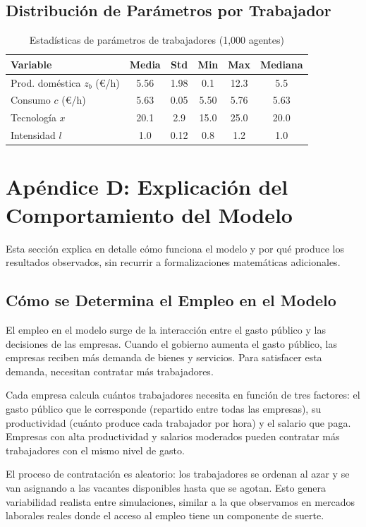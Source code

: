\subsection{Distribución de Parámetros por Trabajador}

\begin{table}[h]
\centering
\caption{Estadísticas de parámetros de trabajadores (1,000 agentes)}
\begin{tabular}{lccccc}
\toprule
\textbf{Variable} & \textbf{Media} & \textbf{Std} & \textbf{Min} & \textbf{Max} & \textbf{Mediana} \\
\midrule
Prod. doméstica $z_b$ (€/h) & 5.56 & 1.98 & 0.1 & 12.3 & 5.5 \\
Consumo $c$ (€/h) & 5.63 & 0.05 & 5.50 & 5.76 & 5.63 \\
Tecnología $x$ & 20.1 & 2.9 & 15.0 & 25.0 & 20.0 \\
Intensidad $l$ & 1.0 & 0.12 & 0.8 & 1.2 & 1.0 \\
\bottomrule
\end{tabular}
\end{table}


\section{Apéndice D: Explicación del Comportamiento del Modelo}

Esta sección explica en detalle cómo funciona el modelo y por qué produce los resultados observados, sin recurrir a formalizaciones matemáticas adicionales.

\subsection{Cómo se Determina el Empleo en el Modelo}

El empleo en el modelo surge de la interacción entre el gasto público y las decisiones de las empresas. Cuando el gobierno aumenta el gasto público, las empresas reciben más demanda de bienes y servicios. Para satisfacer esta demanda, necesitan contratar más trabajadores.

Cada empresa calcula cuántos trabajadores necesita en función de tres factores: el gasto público que le corresponde (repartido entre todas las empresas), su productividad (cuánto produce cada trabajador por hora) y el salario que paga. Empresas con alta productividad y salarios moderados pueden contratar más trabajadores con el mismo nivel de gasto.

El proceso de contratación es aleatorio: los trabajadores se ordenan al azar y se van asignando a las vacantes disponibles hasta que se agotan. Esto genera variabilidad realista entre simulaciones, similar a la que observamos en mercados laborales reales donde el acceso al empleo tiene un componente de suerte.

